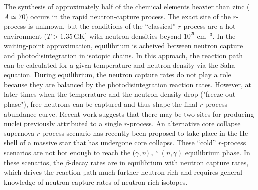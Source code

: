 The synthesis of approximately half of the chemical elements heavier than zinc ($A \simeq 70$) occurs in the rapid neutron-capture process.
The exact site of the $r$-process is unknown, but the conditions of 
the ``classical'' $r$-process %
are a hot environment ($T> 1.35$\,GK) with neutron densities beyond %
$10^{20}$\,cm$^{-3}$. %
 In the waiting-point approximation, equilibrium is acheived between neutron capture and photodisintegration %
 in isotopic chains. %
In this approach, the reaction path can be  calculated for a given temperature and neutron density via the Saha equation. During equilibrium, the neutron capture rates do not play a role %
because they are balanced by the photodisintegration reaction rates. 
However, at later %
 times when 
the temperature and the neutron density drop ("freeze-out phase"), free neutrons %
can be captured and thus shape the final $r$-process abundance curve.
Recent work suggests that there may be two sites for producing nuclei previously attributed to a single $r$-process.
 An alternative core collapse supernova $r$-process scenario has recently been proposed %
to take place in the He shell of a massive star that has undergone core collapse. 
These %
 ``cold'' $r$-process scenarios
 are not hot enough to %
 reach the ($\gamma,n)\rightleftharpoons(n,\gamma)$ equilibrium phase. In these scenarios, the $\beta$-decay rates are in equilibrium with neutron capture rates, which drives the reaction path much further neutron-rich and requires general knowledge of neutron capture rates of neutron-rich isotopes.

